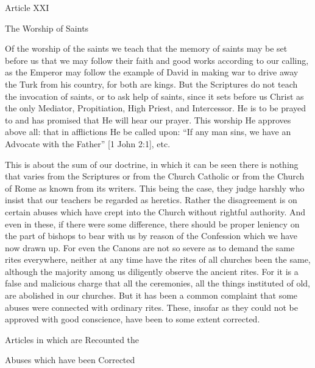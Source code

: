  

Article XXI

The Worship of Saints

Of the worship of the saints we teach that the memory of saints may be set before us that we may follow their faith and good works according to our calling, as the Emperor may follow the example of David in making war to drive away the Turk from his country, for both are kings. But the Scriptures do not teach the invocation of saints, or to ask help of saints, since it sets before us Christ as the only Mediator, Propitiation, High Priest, and Intercessor. He is to be prayed to and has promised that He will hear our prayer. This worship He approves above all: that in afflictions He be called upon: “If any man sins, we have an Advocate with the Father” [1 John 2:1], etc.

 

This is about the sum of our doctrine, in which it can be seen there is nothing that varies from the Scriptures or from the Church Catholic or from the Church of Rome as known from its writers. This being the case, they judge harshly who insist that our teachers be regarded as heretics. Rather the disagreement is on certain abuses which have crept into the Church without rightful authority. And even in these, if there were some difference, there should be proper leniency on the part of bishops to bear with us by reason of the Confession which we have now drawn up. For even the Canons are not so severe as to demand the same rites everywhere, neither at any time have the rites of all churches been the same, although the majority among us diligently observe the ancient rites. For it is a false and malicious charge that all the ceremonies, all the things instituted of old, are abolished in our churches. But it has been a common complaint that some abuses were connected with ordinary rites. These, insofar as they could not be approved with good conscience, have been to some extent corrected.

 

Articles in which are Recounted the

Abuses which have been Corrected

